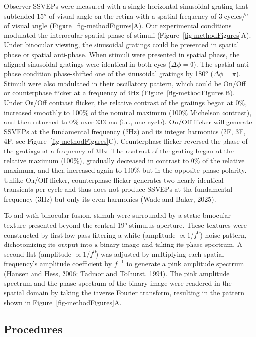 \documentclass[
  12pt,
]{article}
\begin{document}
Observer SSVEPs were measured with a single horizontal sinusoidal
grating that subtended 15\(^o\) of visual angle on the retina with a
spatial frequency of 3 cycles/\(^o\) of visual angle
(Figure~\ref{fig-methodFigures}A). Our experimental conditions modulated
the interocular spatial phase of stimuli
(Figure~\ref{fig-methodFigures}A). Under binocular viewing, the
sinusoidal gratings could be presented in spatial phase or spatial
anti-phase. When stimuli were presented in spatial phase, the aligned
sinusoidal gratings were identical in both eyes (\(\Delta \phi = 0\)).
The spatial anti-phase condition phase-shifted one of the sinusoidal
gratings by 180\(^o\) (\(\Delta \phi = \pi\)). Stimuli were also
modulated in their oscillatory pattern, which could be On/Off or
counterphase flicker at a frequency of 3Hz
(Figure~\ref{fig-methodFigures}B). Under On/Off contrast flicker, the
relative contrast of the gratings began at 0\%, increased smoothly to
100\% of the nominal maximum (100\% Michelson contrast), and then
returned to 0\% over 333 ms (i.e., one cycle). On/Off flicker will
generate SSVEPs at the fundamental frequency (3Hz) and its integer
harmonics (2F, 3F, 4F, see Figure~\ref{fig-methodFigures}C).
Counterphase flicker reversed the phase of the gratings at a frequency
of 3Hz. The contrast of the grating began at the relative maximum
(100\%), gradually decreased in contrast to 0\% of the relative maximum,
and then increased again to 100\% but in the opposite phase polarity.
Unlike On/Off flicker, counterphase flicker generates two nearly
identical transients per cycle and thus does not produce SSVEPs at the
fundamental frequency (3Hz) but only its even harmonics (Wade and Baker,
2025).

To aid with binocular fusion, stimuli were surrounded by a static
binocular texture presented beyond the central 19\(^o\) stimulus
aperture. These textures were constructed by first low-pass filtering a
white (amplitude \(\propto 1/f^0\)) noise pattern, dichotomizing its
output into a binary image and taking its phase spectrum. A second flat
(amplitude \(\propto 1/f^0\)) was adjusted by multiplying each spatial
frequency's amplitude coefficient by \(f^{-1}\) to generate a pink
amplitude spectrum (Hansen and Hess, 2006; Tadmor and Tolhurst, 1994).
The pink amplitude spectrum and the phase spectrum of the binary image
were rendered in the spatial domain by taking the inverse Fourier
transform, resulting in the pattern shown in
Figure~\ref{fig-methodFigures}A.

\subsection{Procedures}\label{procedures}
\end{document}
